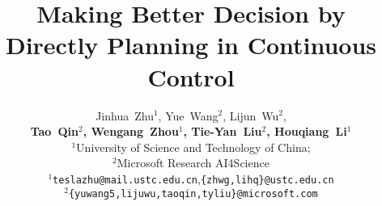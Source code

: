 \documentclass{article} %
\title{Making Better Decision by  Directly Planning  in Continuous Control}
\author{Jinhua~Zhu$^1$, Yue~Wang$^2$, Lijun~Wu$^2$,\\
\textbf{Tao~Qin$^2$, Wengang~Zhou$^1$, Tie-Yan~Liu$^2$, Houqiang~Li$^1$}\\
$^1$University of Science and Technology of China; \\
$^2$Microsoft Research AI4Science\\
$^1$\texttt{teslazhu@mail.ustc.edu.cn},\;\texttt{\{zhwg,lihq\}@ustc.edu.cn}\\
$^2$\texttt{\{yuwang5,lijuwu,taoqin,tyliu\}@microsoft.com}\\
}
\begin{document}
\maketitle

\begin{abstract}
 




\end{abstract}
\end{document}
